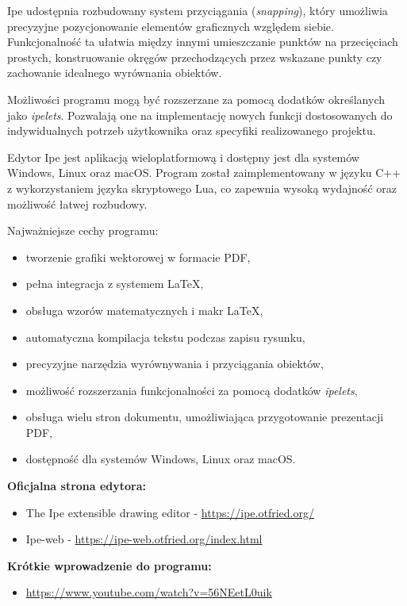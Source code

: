 Ipe udostępnia rozbudowany system przyciągania (\textit{snapping}), który umożliwia precyzyjne pozycjonowanie elementów graficznych względem siebie. Funkcjonalność ta ułatwia między innymi umieszczanie punktów na przecięciach prostych, konstruowanie okręgów przechodzących przez wskazane punkty czy zachowanie idealnego wyrównania obiektów.

Możliwości programu mogą być rozszerzane za pomocą dodatków określanych jako \textit{ipelets}. Pozwalają one na implementację nowych funkcji dostosowanych do indywidualnych potrzeb użytkownika oraz specyfiki realizowanego projektu.

Edytor Ipe jest aplikacją wieloplatformową i dostępny jest dla systemów Windows, Linux oraz macOS. Program został zaimplementowany w języku C++ z wykorzystaniem języka skryptowego Lua, co zapewnia wysoką wydajność oraz możliwość łatwej rozbudowy.

Najważniejsze cechy programu:
\begin{itemize}
    \item tworzenie grafiki wektorowej w formacie PDF,
    \item pełna integracja z systemem \LaTeX{},
    \item obsługa wzorów matematycznych i makr \LaTeX{},
    \item automatyczna kompilacja tekstu podczas zapisu rysunku,
    \item precyzyjne narzędzia wyrównywania i przyciągania obiektów,
    \item możliwość rozszerzania funkcjonalności za pomocą dodatków \textit{ipelets},
    \item obsługa wielu stron dokumentu, umożliwiająca przygotowanie prezentacji PDF,
    \item dostępność dla systemów Windows, Linux oraz macOS.
\end{itemize}

\textbf{Oficjalna strona edytora:}
\begin{itemize}
    \item The Ipe extensible drawing editor - \url{https://ipe.otfried.org/}
    \item Ipe-web - \url{https://ipe-web.otfried.org/index.html}
\end{itemize}

\textbf{Krótkie wprowadzenie do programu:}
\begin{itemize}
    \item \url{https://www.youtube.com/watch?v=56NEetL0uik}
\end{itemize}

